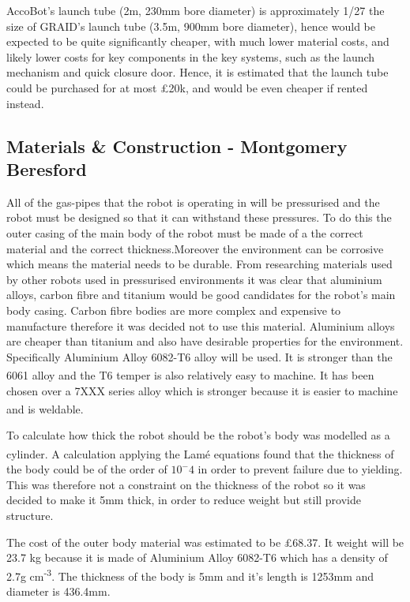 \documentclass[11pt]{article}		%
\newcommand{\supercite}[1]{\textsuperscript{\cite{#1}}}		%
\begin{document}
    		\hspace*{3ex}AccoBot's launch tube (2m, 230mm bore diameter) is approximately 1/27 the size of GRAID's launch tube (3.5m, 900mm bore diameter), hence would be expected to be quite significantly cheaper, with much lower material costs, and likely lower costs for key components in the key systems, such as the launch mechanism and quick closure door. Hence, it is estimated that the launch tube could be purchased for at most £20k, and would be even cheaper if rented instead. 
    		

		\subsection[Materials \& Construction]{Materials \& Construction - Montgomery Beresford}
		
			
			All of the gas-pipes that the robot is operating in will be pressurised and the robot must be designed so that it can withstand these pressures. To do this the outer casing of the main body of the robot must be made of a the correct material and the correct thickness.Moreover the environment can be corrosive which means the material needs to be durable.
		    From researching materials used by other robots used in pressurised environments it was clear that aluminium alloys, carbon fibre and titanium would be good candidates for the robot’s main body casing. Carbon fibre bodies are more complex and expensive to manufacture therefore it was decided not to use this material. Aluminium alloys are cheaper than titanium and also have desirable properties for the environment.
		    Specifically Aluminium Alloy 6082-T6 alloy will be used. It is stronger than the 6061 alloy and the T6 temper is also relatively easy to machine.\supercite{Aluminium_Alloys}  It has been chosen over a 7XXX series alloy which is stronger because it is easier to machine and is weldable. \supercite{Aluminium_Alloys_differences}
		    
		   To calculate how thick the robot should be the robot's body was modelled as a cylinder. A calculation applying the Lamé equations \supercite{lame} found that the thickness of the body could be of the order of $10^-4$ in order to prevent failure due to yielding. This was therefore not a constraint on the thickness of the robot so it was decided to make it 5mm thick, in order to reduce weight but still provide structure.
		   
		   The cost of the outer body material was estimated to be £68.37. It weight will be 23.7 kg because it is made of Aluminium Alloy 6082-T6 which has a density of 2.7g cm\textsuperscript{-3}. The thickness of the body is 5mm and it's length is 1253mm and diameter is 436.4mm.
		   
\end{document}
